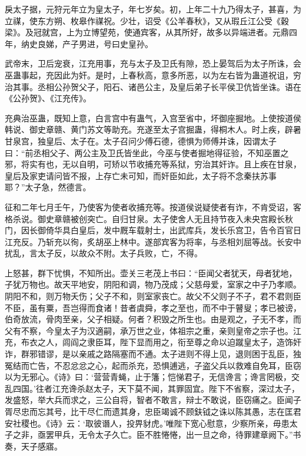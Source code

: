 \documentclass[12pt,UTF8]{ctexbook}
\begin{document}
戾太子据，元狩元年立为皇太子，年七岁矣。初，上年二十九乃得太子，甚喜，为立禖，使东方朔、枚皋作禖祝。少壮，诏受《公羊春秋》，又从瑕丘江公受《穀梁》。及冠就宫，上为立博望苑，使通宾客，从其所好，故多以异端进者。元鼎四年，纳史良娣，产子男进，号曰史皇孙。



武帝末，卫后宠衰，江充用事，充与太子及卫氏有隙，恐上晏驾后为太子所诛，会巫蛊事起，充因此为奸。是时，上春秋高，意多所恶，以为左右皆为蛊道祝诅，穷治其事。丞相公孙贺父子，阳石、诸邑公主，及皇后弟子长平侯卫伉皆坐诛。语在《公孙贺》、《江充传》。



充典治巫蛊，既知上意，白言宫中有蛊气，入宫至省中，坏御座掘地。上使按道侯韩说、御史章赣、黄门苏文等助充。充遂至太子宫掘蛊，得桐木人。时上疾，辟暑甘泉宫，独皇后、太子在。太子召问少傅石德，德惧为师傅并诛，因谓太子曰：“前丞相父子、两公主及卫氏皆坐此，今巫与使者掘地得征验，不知巫置之邪，将实有也，无以自明，可矫以节收捕充等系狱，穷治其奸诈。且上疾在甘泉，皇后及家吏请问皆不报，上存亡未可知，而奸臣如此，太子将不念秦扶苏事耶？”太子急，然德言。



征和二年七月壬午，乃使客为使者收捕充等。按道侯说疑使者有诈，不肯受诏，客格杀说。御史章赣被创突亡。自归甘泉。太子使舍人无且持节夜入未央宫殿长秋门，因长御倚华具白皇后，发中厩车载射士，出武库兵，发长乐宫卫，告令百官日江充反。乃斩充以徇，炙胡巫上林中。遂部宾客为将率，与丞相刘屈等战。长安中扰乱，言太子反，以故众不附。太子兵败，亡，不得。



上怒甚，群下忧惧，不知所出。壶关三老茂上书曰：“臣闻父者犹天，母者犹地，子犹万物也。故天平地安，阴阳和调，物乃茂成；父慈母爱，室家之中子乃孝顺。阴阳不和，则万物夭伤；父子不和，则室家丧亡。故父不父则子不子，君不君则臣不臣，虽有粟，吾岂得而食诸！昔者虞舜，孝之至也，而不中于瞽叟；孝已被谤，伯奇放流，骨肉至亲，父子相疑。何者？积毁之所生也。由是观之，子无不孝，而父有不察，今皇太子为汉適嗣，承万世之业，体祖宗之重，亲则皇帝之宗子也。江充，布衣之人，闾阎之隶臣耳，陛下显而用之，衔至尊之命以迫蹴皇太子，造饰奸诈，群邪错谬，是以亲戚之路隔塞而不通。太子进则不得上见，退则困于乱臣，独冤结而亡告，不忍忿忿之心，起而杀充，恐惧逋逃，子盗父兵以救难自免耳，臣窃以为无邪心。《诗》曰：‘营营青蝇，止于籓；恺悌君子，无信谗言；谗言罔极，交乱四国。’往者江充谗杀赵太子，天下莫不闻，其罪固宜。陛下不省察，深过太子，发盛怒，举大兵而求之，三公自将，智者不敢言，辩士不敢说，臣窃痛之。臣闻子胥尽忠而忘其号，比干尽仁而遗其身，忠臣竭诚不顾鈇钺之诛以陈其愚，志在匡君安社稷也。《诗》云：‘取彼谮人，投畀豺虎。’唯陛下宽心慰意，少察所亲，毋患太子之非，亟罢甲兵，无令太子久亡。臣不胜惓惓，出一旦之命，待罪建章阙下。”书奏，天子感寤。
\end{document}
